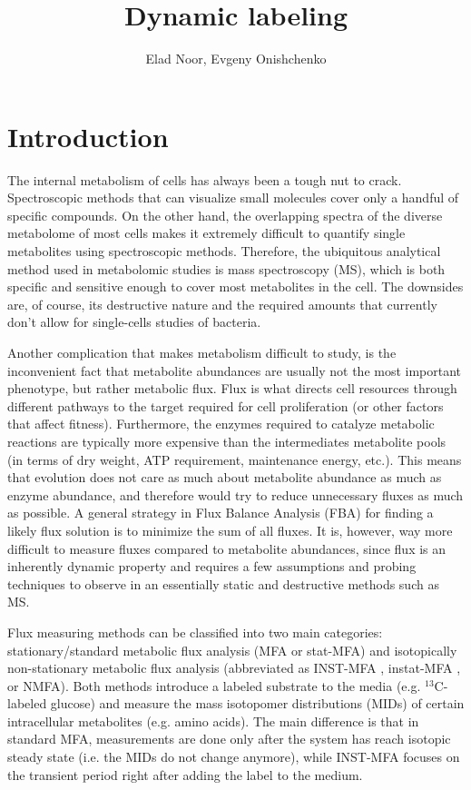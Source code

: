 \documentclass{article}
\title{Dynamic labeling}
\author{Elad Noor, Evgeny Onishchenko}
\begin{document}
\maketitle

\section{Introduction}

The internal metabolism of cells has always been a tough nut to crack. Spectroscopic methods that can visualize small molecules cover only a handful of specific compounds. On the other hand, the overlapping spectra of the diverse metabolome of most cells makes it extremely difficult to quantify single metabolites using spectroscopic methods. Therefore, the ubiquitous analytical method used in metabolomic studies is mass spectroscopy (MS), which is both specific and sensitive enough to cover most metabolites in the cell. The downsides are, of course, its destructive nature and the required amounts that currently don't allow for single-cells studies of bacteria.

Another complication that makes metabolism difficult to study, is the inconvenient fact that metabolite abundances are usually not the most important phenotype, but rather metabolic flux. Flux is what directs cell resources through different pathways to the target required for cell proliferation (or other factors that affect fitness). Furthermore, the enzymes required to catalyze metabolic reactions are typically more expensive than the intermediates metabolite pools (in terms of dry weight, ATP requirement, maintenance energy, etc.). This means that evolution does not care as much about metabolite abundance as much as enzyme abundance, and therefore would try to reduce unnecessary fluxes as much as possible. A general strategy in Flux Balance Analysis (FBA) for finding a likely flux solution is to minimize the sum of all fluxes. It is, however, way more difficult to measure fluxes compared to metabolite abundances, since flux is an inherently dynamic property and requires a few assumptions and probing techniques to observe in an essentially static and destructive methods such as MS.

Flux measuring methods can be classified into two main categories: stationary/standard metabolic flux analysis (MFA or stat-MFA) and isotopically non-stationary metabolic flux analysis (abbreviated as INST-MFA \cite{noh_metabolic_2007, jazmin_isotopically_2014}, instat-MFA \cite{heise_flux_2014}, or NMFA\cite{young_elementary_2008, young_inca:_2014}). Both methods introduce a labeled substrate to the media (e.g. $^{13}$C-labeled glucose) and measure the mass isotopomer distributions (MIDs) of certain intracellular metabolites (e.g. amino acids). The main difference is that in standard MFA, measurements are done only after the system has reach isotopic steady state (i.e. the MIDs do not change anymore), while INST-MFA focuses on the transient period right after adding the label to the medium. 
\end{document}
